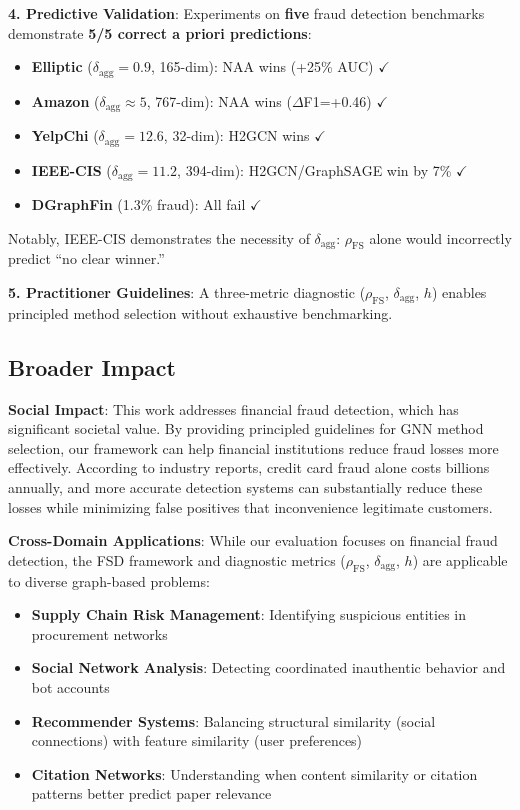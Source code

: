 \textbf{4. Predictive Validation}: Experiments on \textbf{five} fraud detection benchmarks demonstrate \textbf{5/5 correct a priori predictions}:
\begin{itemize}
    \item \textbf{Elliptic} ($\delta_{\text{agg}}=0.9$, 165-dim): NAA wins (+25\% AUC) $\checkmark$
    \item \textbf{Amazon} ($\delta_{\text{agg}}\approx5$, 767-dim): NAA wins ($\Delta$F1=+0.46) $\checkmark$
    \item \textbf{YelpChi} ($\delta_{\text{agg}}=12.6$, 32-dim): H2GCN wins $\checkmark$
    \item \textbf{IEEE-CIS} ($\delta_{\text{agg}}=11.2$, 394-dim): H2GCN/GraphSAGE win by 7\% $\checkmark$
    \item \textbf{DGraphFin} (1.3\% fraud): All fail $\checkmark$
\end{itemize}
Notably, IEEE-CIS demonstrates the necessity of $\delta_{\text{agg}}$: $\rho_{\text{FS}}$ alone would incorrectly predict ``no clear winner.''

\textbf{5. Practitioner Guidelines}: A three-metric diagnostic ($\rho_{\text{FS}}$, $\delta_{\text{agg}}$, $h$) enables principled method selection without exhaustive benchmarking.

\subsection{Broader Impact}

\textbf{Social Impact}: This work addresses financial fraud detection, which has significant societal value. By providing principled guidelines for GNN method selection, our framework can help financial institutions reduce fraud losses more effectively. According to industry reports, credit card fraud alone costs billions annually, and more accurate detection systems can substantially reduce these losses while minimizing false positives that inconvenience legitimate customers.

\textbf{Cross-Domain Applications}: While our evaluation focuses on financial fraud detection, the FSD framework and diagnostic metrics ($\rho_{\text{FS}}$, $\delta_{\text{agg}}$, $h$) are applicable to diverse graph-based problems:
\begin{itemize}
    \item \textbf{Supply Chain Risk Management}: Identifying suspicious entities in procurement networks
    \item \textbf{Social Network Analysis}: Detecting coordinated inauthentic behavior and bot accounts
    \item \textbf{Recommender Systems}: Balancing structural similarity (social connections) with feature similarity (user preferences)
    \item \textbf{Citation Networks}: Understanding when content similarity or citation patterns better predict paper relevance
\end{itemize}

